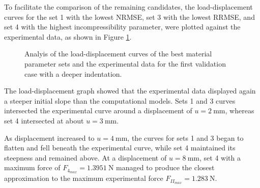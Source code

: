 To facilitate the comparison of the remaining candidates, the load-displacement curves for the 
set \SI{1}{} with the lowest NRMSE, set \SI{3}{} with the lowest RRMSE, and set \SI{4}{}  with the highest 
incompressibility parameter, were plotted against the experimental data, as shown in Figure \ref{fig:8mmloaddisplcurves}.\\ 
\begin{figure}%
    \centering
   \quad
   \caption[First validation case load-displacement curves]{Analyis of the load-displacement curves of the best material parameter sets and the experimental data for the first validation case with a deeper indentation.}%
   \label{fig:8mmloaddisplcurves}%
\end{figure}

The load-displacement graph showed that the experimental data displayed again a steeper initial slope 
than the computational models. Sets \SI{1}{} and \SI{3}{} curves intersected the experimental curve 
around a displacement of $u=\SI{2}{\milli \meter}$, whereas set \SI{4}{} intersected at about $u=\SI{3}{\milli \meter}$.

As displacement increased to $u=\SI{4}{\milli \meter}$, the curves for sets \SI{1}{} and \SI{3}{} began 
to flatten and fell beneath the experimental curve, while set \SI{4}{} maintained its steepness and remained above.
At a displacement of $u=\SI{8}{\milli \meter}$, set \SI{4}{} with a maximum force of 
$F_{4_{max}}=\SI{1.3951}{\newton}$ managed to produce the closest 
approximation to the maximum experimental force $F_{II_{max}}=\SI{1.283}{\newton}$.

